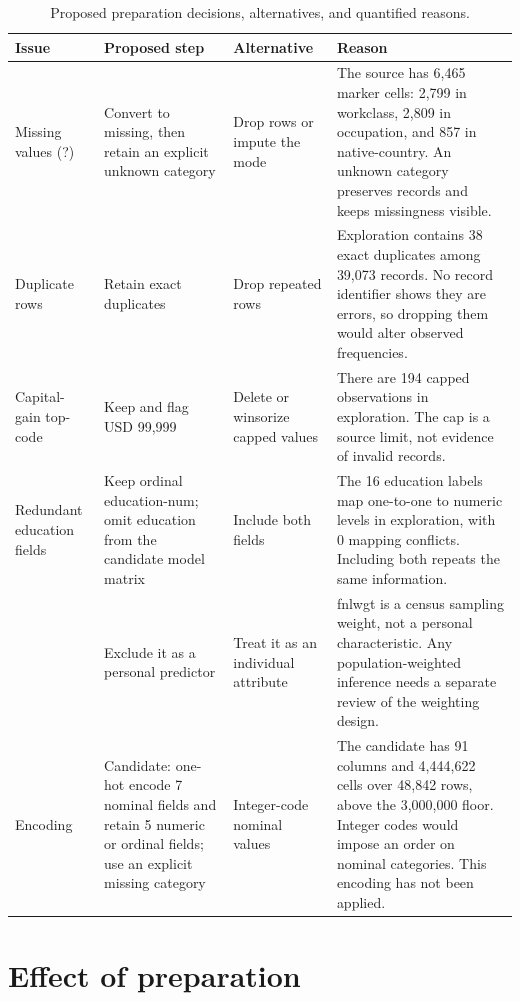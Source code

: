 \documentclass[11pt,a4paper]{article}
\newcommand{\code}[1]{{\small\ttfamily #1}}
\newcommand{\stripe}{\rowcolors{2}{tint}{white}}
\begin{document}
\begin{table}[H]
\centering\stripe
\caption{Proposed preparation decisions, alternatives, and quantified reasons.}
\label{tab:prep}
\footnotesize
\begin{tabularx}{\textwidth}{@{}>{\raggedright\arraybackslash}p{2.6cm} >{\raggedright\arraybackslash}p{3cm} >{\raggedright\arraybackslash}p{2.5cm} X@{}}
\toprule
\rowcolor{white}\textbf{Issue} & \textbf{Proposed step} & \textbf{Alternative} & \textbf{Reason}\\
\midrule
Missing values (\code{?}) & Convert to missing, then retain an explicit unknown category & Drop rows or impute the mode & The source has 6,465 marker cells: 2,799 in workclass, 2,809 in occupation, and 857 in native-country. An unknown category preserves records and keeps missingness visible.\\
Duplicate rows & Retain exact duplicates & Drop repeated rows & Exploration contains 38 exact duplicates among 39,073 records. No record identifier shows they are errors, so dropping them would alter observed frequencies.\\
Capital-gain top-code & Keep and flag USD 99,999 & Delete or winsorize capped values & There are 194 capped observations in exploration. The cap is a source limit, not evidence of invalid records.\\
Redundant education fields & Keep ordinal \code{education-num}; omit \code{education} from the candidate model matrix & Include both fields & The 16 education labels map one-to-one to numeric levels in exploration, with 0 mapping conflicts. Including both repeats the same information.\\
\code{fnlwgt} & Exclude it as a personal predictor & Treat it as an individual attribute & \code{fnlwgt} is a census sampling weight, not a personal characteristic. Any population-weighted inference needs a separate review of the weighting design.\\
Encoding & Candidate: one-hot encode 7 nominal fields and retain 5 numeric or ordinal fields; use an explicit missing category & Integer-code nominal values & The candidate has 91 columns and 4,444,622 cells over 48,842 rows, above the 3,000,000 floor. Integer codes would impose an order on nominal categories. This encoding has not been applied.\\
\bottomrule
\end{tabularx}
\end{table}

\section{Effect of preparation}
\end{document}
